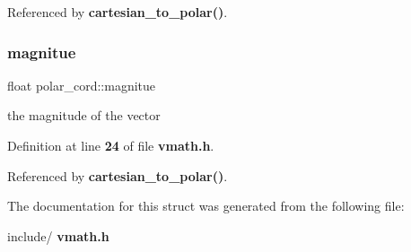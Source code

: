 Referenced by \textbf{ cartesian\+\_\+to\+\_\+polar()}.

\mbox{\label{structpolar__cord_aec2e25fecc82af176f0fcd23f1e02f0c}} 
\subsubsection{magnitue}
{\footnotesize\ttfamily float polar\+\_\+cord\+::magnitue}

the magnitude of the vector 

Definition at line \textbf{ 24} of file \textbf{ vmath.\+h}.



Referenced by \textbf{ cartesian\+\_\+to\+\_\+polar()}.



The documentation for this struct was generated from the following file\+:\begin{DoxyCompactItemize}
\item 
include/\textbf{ vmath.\+h}\end{DoxyCompactItemize}

